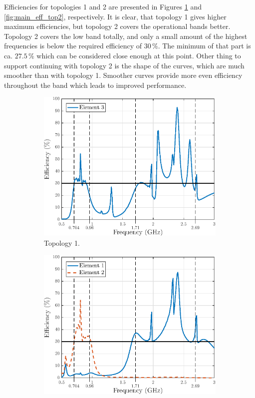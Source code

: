 Efficiencies for topologies 1 and 2 are presented in Figures \ref{fig:main_eff_top1} and \ref{fig:main_eff_top2}, respectively. It is clear, that topology 1 gives higher maximum efficiencies, but topology 2 covers the operational bands better. Topology 2 covers the low band totally, and only a small amount of the highest frequencies is below the required efficiency of $30\,\%$. The minimum of that part is ca. $27.5\,\%$ which can be considered close enough at this point. Other thing to support continuing with topology 2 is the shape of the curves, which are much smoother than with topology 1. Smoother curves provide more even efficiency throughout the band which leads to improved performance.

\begin{figure}[H]
    \centering
    \begin{subfigure}[b]{0.49\textwidth}
        \includegraphics[width=\textwidth]{img/eff2_main.eps}
        \caption{Topology 1.}
        \label{fig:main_eff_top1}
    \end{subfigure}
    \begin{subfigure}[b]{0.49\textwidth}
        \includegraphics[width=\textwidth]{img/eff1_main.eps}

\end{subfigure}
\end{figure}
